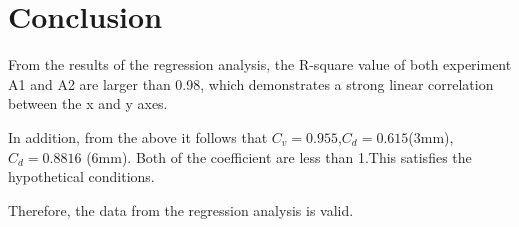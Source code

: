 \section{Conclusion}
\label{sec:conclusion}

From the results of the regression analysis, 
the R-square value of both experiment A1 and A2 are larger than 0.98, 
which demonstrates a strong linear correlation between the x and y axes.

In addition, from the above it follows that $C_v = 0.955$,$C_d=0.615$(3mm),$C_d=0.8816$
(6mm). Both of the coefficient are less than 1.This satisfies the hypothetical conditions.

Therefore, the data from the regression analysis is valid.

